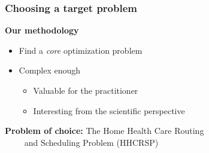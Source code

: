 \begin{frame}
   \frametitle{Choosing a target problem}

   \textbf{Our methodology}
   \begin{itemize}
      \item Find a \textit{core} optimization problem
      \item Complex enough
      \begin{itemize}
         \item Valuable for the practitioner
         \item Interesting from the scientific perspective
      \end{itemize}
   \end{itemize}

   \vspace*{18pt}
  \pause


   \textbf{Problem of choice: } The Home Health Care Routing \\
   \qquad \qquad \qquad \qquad ~~~~ and Scheduling Problem (HHCRSP)



\end{frame}

%

